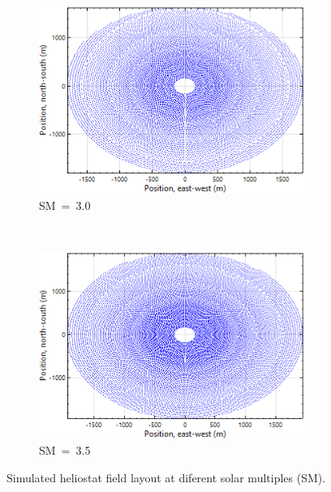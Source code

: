 \begin{figure}[!htbp]
\par\medskip %
                
        \begin{subfigure}[b]{0.5\textwidth}
                \centering
                \includegraphics[width=0.95\textwidth]{FIG/SM30}
                \caption{SM~=~3.0}\label{SM3.0}
        \end{subfigure}%
        ~
        \begin{subfigure}[b]{0.5\textwidth}
                \centering
                \includegraphics[width=0.95\textwidth]{FIG/SM35}
                \caption{SM~=~3.5}\label{SM3.5}
        \end{subfigure}
        \caption[Simulated heliostat field layout at diferent solar multiples (SM).]{Simulated heliostat field layout at diferent solar multiples (SM).}\label{SM}
\end{figure}
